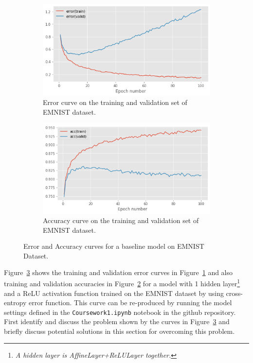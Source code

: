 \documentclass[11pt,]{article}
\begin{document}
\begin{figure}
\centering

\begin{subfigure}{.8\textwidth}
\centering

\includegraphics[width=0.75\linewidth]{error_IHO_withrelu.png}
\caption{Error curve on the training and validation set of EMNIST dataset.} 
\label{fig:error}
\end{subfigure}
\centering

\begin{subfigure}{.8\textwidth}
\centering

\includegraphics[width=0.8\linewidth]{accuracy_IHO_withrelu.png}
\caption{Accuracy curve on the training and validation set of EMNIST dataset.}

\label{fig:accuracy}
\end{subfigure}
\caption{Error and Accuracy curves for a baseline model on EMNIST Dataset.}
\label{fig:errorfn}

\end{figure}

Figure~\ref{fig:errorfn} shows the training and validation error curves in Figure~\ref{fig:error} and also training and validation accuracies in Figure~\ref{fig:accuracy} for a model with 1 hidden layer\footnote{\textit{A hidden layer is AffineLayer+ReLULayer together.}} and a ReLU activation function trained on the EMNIST dataset by using cross-entropy error function. 
This curve can be re-produced by running the model settings defined in the \texttt{Coursework1.ipynb} notebook in the github repository.
First identify and discuss the problem shown by the curves in Figure~\ref{fig:errorfn} and briefly discuss potential solutions in this section for overcoming this problem.
\end{document}
